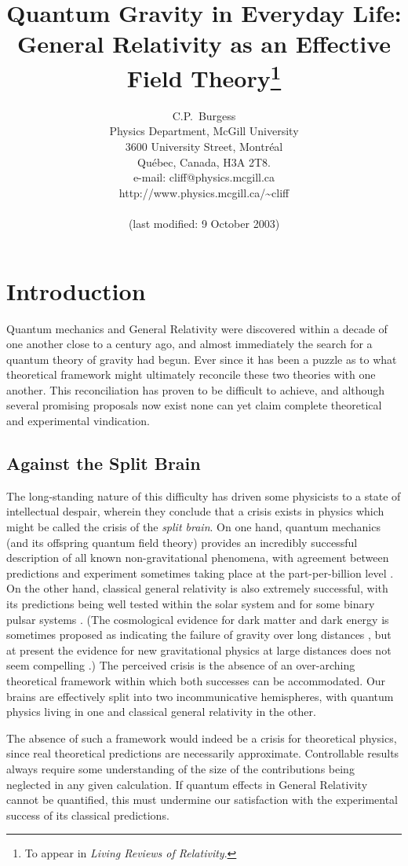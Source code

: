 \documentclass[12pt]{JHEP3}
\title{Quantum Gravity in Everyday Life:\\
General Relativity as an Effective Field Theory\footnote{To appear
in {\it Living Reviews of Relativity}.}}
\author{C.P.\ Burgess \\
        Physics Department, McGill University \\
        3600 University Street, Montr{\'e}al \\
        Qu{\'e}bec, Canada, H3A 2T8. \\
        e-mail: cliff@physics.mcgill.ca \\
        http://www.physics.mcgill.ca/\protect\~\protect cliff \\
\\
\small{(last modified: 9 October 2003)} }
\date{}
\begin{document}


\section{Introduction}
\label{section:introduction}
%
Quantum mechanics and General Relativity were discovered within a
decade of one another close to a century ago, and almost
immediately the search for a quantum theory of gravity had begun.
Ever since it has been a puzzle as to what theoretical framework
might ultimately reconcile these two theories with one another.
This reconciliation has proven to be difficult to achieve, and
although several promising proposals now exist none can yet claim
complete theoretical and experimental vindication.

\subsection{Against the Split Brain}
%
The long-standing nature of this difficulty has driven some
physicists to a state of intellectual despair, wherein they
conclude that a crisis exists in physics which might be called the
crisis of the \emph{split brain}. On one hand, quantum mechanics
(and its offspring quantum field theory) provides an incredibly
successful description of all known non-gravitational phenomena,
with agreement between predictions and experiment sometimes taking
place at the part-per-billion level \cite{QED,EWdata}. On the
other hand, classical general relativity is also extremely
successful, with its predictions being well tested within the
solar system and for some binary pulsar systems \cite{GRdata}.
(The cosmological evidence for dark matter and dark energy is
sometimes proposed as indicating the failure of gravity over long
distances \cite{MOND}, but at present the evidence for new
gravitational physics at large distances does not seem compelling
\cite{DMvsNP}.) The perceived crisis is the absence of an
over-arching theoretical framework within which both successes can
be accommodated. Our brains are effectively split into two
incommunicative hemispheres, with quantum physics living in one
and classical general relativity in the other.

The absence of such a framework would indeed be a crisis for
theoretical physics, since real theoretical predictions are
necessarily approximate. Controllable results always require some
understanding of the size of the contributions being neglected in
any given calculation. If quantum effects in General Relativity
cannot be quantified, this must undermine our satisfaction with
the experimental success of its classical predictions.
\end{document}
